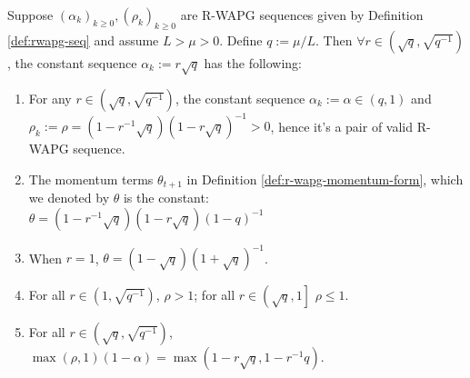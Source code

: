 \documentclass[12pt]{article}
\begin{document}
    \begin{lemma}\label{lemma:constant-rwapg-seq}
        Suppose $(\alpha_k)_{k \ge 0}, (\rho_k)_{k \ge 0}$ are R-WAPG sequences given by Definition \ref{def:rwapg-seq} and assume $L > \mu > 0$.
        Define $q := \mu/L$. 
        Then $\forall r \in \left(\sqrt{q},\sqrt{q^{-1}}\right)$, the constant sequence $\alpha_k := r \sqrt{q}$ has the following: 
        \begin{enumerate}
            \item For any $r \in \left(\sqrt{q}, \sqrt{q^{-1}}\right)$, the constant sequence $\alpha_k := \alpha \in (q, 1)$ and\\
            $\rho_k := \rho=\left(1-r^{-1}\sqrt{q}\right)\left(1 - r \sqrt{q}\right)^{-1} > 0$, hence it's a pair of valid R-WAPG sequence. 
            \item The momentum terms $\theta_{t + 1}$ in Definition \ref{def:r-wapg-momentum-form}, which we denoted by $\theta$ is the constant:\\ $\theta = (1 - r^{-1}\sqrt{q})(1 - r\sqrt{q})(1- q)^{-1}$
            \item When $r = 1$, $\theta = (1- \sqrt{q})(1 + \sqrt{q})^{-1}$. 
            \item For all $r \in \left(1, \sqrt{q^{-1}}\right)$, $\rho > 1$; for all $r \in \left(\sqrt{q}, 1\right]$ $\rho \le 1$. 
            \item For all $r \in \left(\sqrt{q}, \sqrt{q^{-1}}\right)$, $\max(\rho, 1)(1 - \alpha) = \max\left(1 - r\sqrt{q}, 1 - r^{-1}q\right)$. 
        \end{enumerate}
    \end{lemma}
\end{document}
